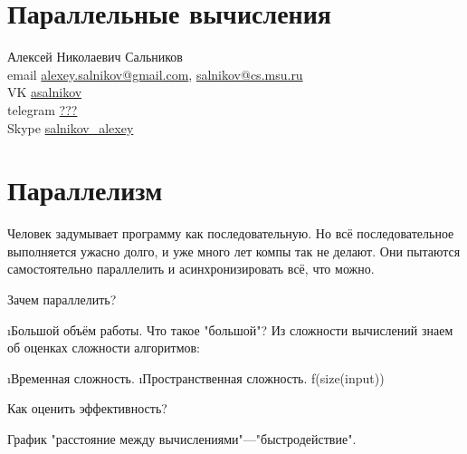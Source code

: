 



\section{Параллельные вычисления}
 Алексей Николаевич Сальников\\
 email \href{mailto:alexey.salnikov@gmail.com}{alexey.salnikov@gmail.com}, \href{mailto:salnikov@cs.msu.ru}{salnikov@cs.msu.ru}\\
 VK \href{http://vk.com/asalnikov}{asalnikov}\\
 telegram \href{tg:???}{???}\\
 Skype \href{skype:salnikov\_alexey}{salnikov\_alexey}
 
 \section{Параллелизм}
 Человек задумывает программу как последовательную. Но всё последовательное выполняется ужасно долго, и уже много лет компы так не делают. Они пытаются самостоятельно параллелить и асинхронизировать всё, что можно.
 
 Зачем параллелить?
 \begin{enumerate}
  \i Большой объём работы.
  Что такое "большой"? Из сложности вычислений знаем об оценках сложности алгоритмов:
  \begin{enumerate}
   \i Временная сложность.
   \i Пространственная сложность.
     f(size(input))
  \end{enumerate}
 \end{enumerate}
 
 Как оценить эффективность?
 
 График "расстояние между вычислениями"---"быстродействие".
 
